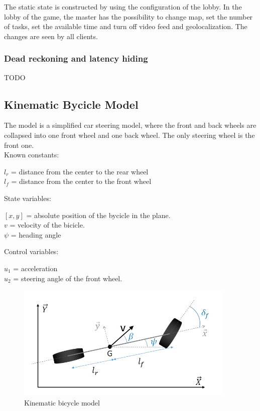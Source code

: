 \documentclass{article}
\begin{document}
\smallskip
The static state is constructed by using the configuration of the lobby. In the lobby of the game, the master has the possibility to change map, set the number of tasks, set the available time and  turn off video feed and geolocalization. The changes are seen by all clients.

\subsubsection{Dead reckoning and latency hiding}
TODO

\clearpage

\subsection{Kinematic Bycicle Model \cite{kbm}}
The model is a simplified car steering model, where the front and back wheels are collapsed into one front wheel and one back wheel. The only steering wheel is the front one. \\
\smallskip
Known constants:
\begin{center}
\( l_r \) = distance from the center to the rear wheel \\
\( l_f \) = distance from the center to the front wheel \\
\end{center}
State variables:
\begin{center}
\( [x, y] \) = absolute position of the bycicle in the plane. \\
\( v \) = velocity of the bicicle. \\
\( \psi \) = heading angle \\
\end{center}
Control variables:
\begin{center}
\( u_1 \) = acceleration \\
\( u_2 \) = steering angle of the front wheel. \\
\end{center}
\begin{figure}[!h]
\includegraphics[width=\textwidth]{bike}
\caption{Kinematic bicycle model}
\end{figure}
\end{document}
